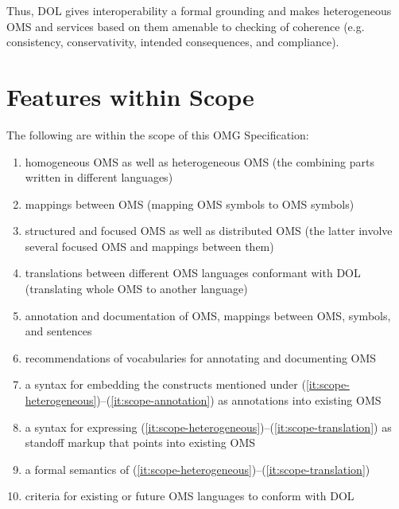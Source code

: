 \documentclass[10pt,%
\ifpretendfinal
final%
\else
draft%
\fi,
]{scrreprt}
\makeatletter
\newcommand*{\eg}{e.g.\@\xspace}
\newcommand*{\IS}{OMG Specification\xspace}
\makeatother
\begin{document}
Thus, DOL gives interoperability a formal grounding and makes heterogeneous OMS and services based on them amenable to checking of coherence (\eg consistency, conservativity, intended consequences, and compliance).



\section{Features within Scope}
The following are within the scope of this \IS:
\begin{enumerate}
\item\label{it:scope-heterogeneous} homogeneous OMS as well as heterogeneous OMS (the combining parts written in different languages)
\item mappings between OMS (mapping
OMS symbols to OMS symbols)
\item structured and focused OMS as well as distributed OMS (the latter involve several focused OMS and mappings between them)
\item \label{it:scope-translation} translations between different OMS languages conformant with DOL (translating whole OMS to another language)
\item\label{it:scope-annotation} annotation and documentation of OMS, mappings between OMS, symbols,
and sentences
\item recommendations of vocabularies for annotating and documenting OMS
\item a syntax for embedding the constructs mentioned under (\ref{it:scope-heterogeneous})–(\ref{it:scope-annotation}) as annotations into existing OMS
\item a syntax for expressing (\ref{it:scope-heterogeneous})–(\ref{it:scope-translation}) as standoff markup that points into existing OMS
\item a formal semantics of (\ref{it:scope-heterogeneous})–(\ref{it:scope-translation})
\item criteria for existing or future OMS languages to conform with DOL
\end{enumerate}
\end{document}
